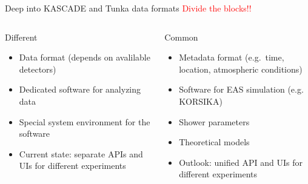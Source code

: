 \documentclass[18pt]{beamer}
\begin{document}
\begin{frame}{Deep into KASCADE and Tunka data formats}
\textcolor{red}{Divide the blocks!!}
\begin{columns}
  \begin{column}[t]{0.49\textwidth}
    \begin{block}{Different}
      \begin{itemize}
        \item Data format (depends on avalilable detectors)
        \item Dedicated software for analyzing data
        \item Special system environment for the software
        \item \textcolor{red!50!black}{Current state}: separate APIs and UIs for different experiments
      \end{itemize}
    \end{block}

  \end{column}
  \hfill
  \begin{column}[t]{0.49\textwidth}
    \begin{block}{Common}
      \begin{itemize}
        \item Metadata format (e.g.\ time, location, atmospheric conditions)
        \item Software for EAS simulation (e.g. KORSIKA)
        \item Shower parameters
        \item Theoretical models
        \item \textcolor{blue!50!black}{Outlook}: unified API and UIs for different experiments
      \end{itemize}
    \end{block}
  \end{column}
\end{columns}
\end{frame}
\end{document}
